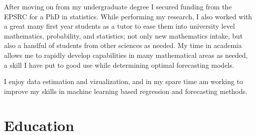 \documentclass[print, oneside]{friggeri-cv} %
\begin{document}
\begin{entrylist}
{\quad After moving on from my undergraduate degree I secured funding from the EPSRC for a PhD in statistics.
While performing my research, I also worked with a great many first year students as a tutor to ease them into university level mathematics, probability, and statistics; not only new mathematics intake, but also a handful of students from other sciences as needed.
My time in academia allows me to rapidly develop capabilities in many mathematical areas as needed, a skill I have put to good use while determining optimal forecasting models.

\quad I enjoy data estimation and vizualization, and in my spare time am working to improve my skills in machine learning based regression and forecasting methods.
}




\end{entrylist}



\section{Education}
\end{document}

